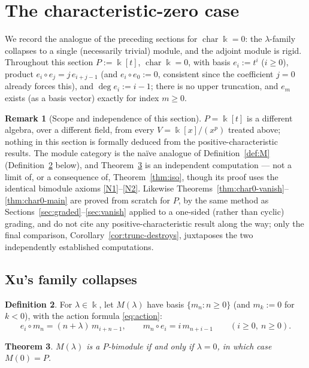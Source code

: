 \documentclass[11pt,reqno]{amsart}
\theoremstyle{plain}
\newtheorem{theorem}{Theorem}[section]
\theoremstyle{definition}
\newtheorem{definition}[theorem]{Definition}
\newtheorem{remark}[theorem]{Remark}
\newcommand{\kk}{\Bbbk}
\begin{document}
\section{The characteristic-zero case}\label{sec:char0}

We record the analogue of the preceding sections for $\operatorname{char}\kk=0$: the
$\lambda$-family collapses to a single (necessarily trivial) module, and the adjoint module
is rigid. Throughout this section $P:=\kk[t]$, $\operatorname{char}\kk=0$, with basis
$e_i:=t^i$ ($i\ge0$), product $e_i\circ e_j=j\,e_{i+j-1}$ (and $e_i\circ e_0:=0$, consistent
since the coefficient $j=0$ already forces this), and $\deg e_i:=i-1$; there is no upper
truncation, and $e_m$ exists (as a basis vector) exactly for index $m\ge0$.

\begin{remark}[Scope and independence of this section]
$P=\kk[t]$ is a different algebra, over a different field, from every $V=\kk[x]/(x^p)$
treated above; nothing in this section is formally deduced from the positive-characteristic
results. The module category is the na\"ive analogue of Definition~\ref{def:M}
(Definition~\ref{def:M0} below), and Theorem~\ref{thm:char0-module} is an independent
computation --- not a limit of, or a consequence of, Theorem~\ref{thm:iso}, though its proof
uses the identical bimodule axioms \eqref{N1}--\eqref{N2}. Likewise
Theorems~\ref{thm:char0-vanish}--\ref{thm:char0-main} are proved from scratch for $P$, by the
same method as Sections~\ref{sec:graded}--\ref{sec:vanish} applied to a one-sided (rather than
cyclic) grading, and do not cite any positive-characteristic result along the way; only the
final comparison, Corollary~\ref{cor:trunc-destroys}, juxtaposes the two independently
established computations.
\end{remark}

\subsection{Xu's family collapses}

\begin{definition}\label{def:M0}
For $\lambda\in\kk$, let $M(\lambda)$ have basis $\{m_n:n\ge0\}$ (and $m_k:=0$ for $k<0$),
with the action formula \eqref{eq:action}:
\[
e_i\circ m_n=(n+\lambda)\,m_{i+n-1},\qquad m_n\circ e_i=i\,m_{n+i-1}\qquad(i\ge0,\ n\ge0).
\]
\end{definition}

\begin{theorem}\label{thm:char0-module}
$M(\lambda)$ is a $P$-bimodule if and only if $\lambda=0$, in which case $M(0)=P$.
\end{theorem}
\end{document}
